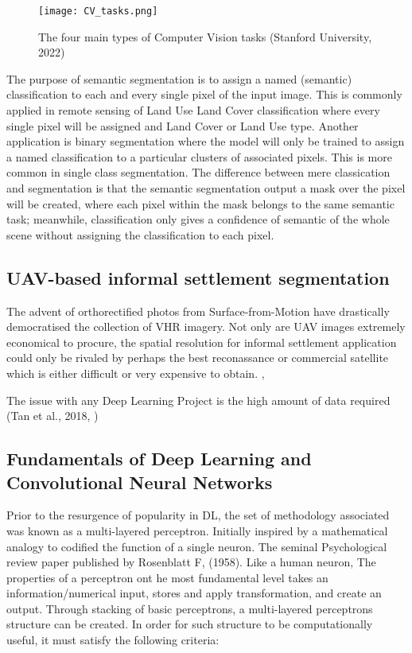 \documentclass[11pt, a4paper, twoside]{report}
\begin{document}
\begin{figure}[H]
\centering
\texttt{[image: CV\_tasks.png]}
  \caption{The four main types of Computer Vision tasks (Stanford University, 2022)}
\label{fig:CV_tasks}
\end{figure}

The purpose of semantic segmentation is to assign a named (semantic) classification to each and every single pixel of the input image. This is commonly applied in remote sensing of Land Use Land Cover classification where every single pixel will be assigned and Land Cover or Land Use type. Another application is binary segmentation where the model will only be trained to assign a named classification to a particular clusters of associated pixels. This is more common in single class segmentation. The difference between mere classication and segmentation is that the semantic segmentation output a mask over the pixel will be created, where each pixel within the mask belongs to the same semantic task; meanwhile, classification only gives a confidence of semantic of the whole scene without assigning the classification to each pixel.


\subsection{UAV-based informal settlement segmentation}\label{CVandCNN}

The advent of orthorectified photos from Surface-from-Motion have drastically democratised the collection of VHR imagery. Not only are UAV images extremely economical to procure, the spatial resolution for informal settlement application could only be rivaled by perhaps the best reconassance or commercial satellite which is either difficult or very expensive to obtain. ,

The issue with any Deep Learning Project is the high amount of data required (Tan et al., 2018, )

\subsection{Fundamentals of Deep Learning and Convolutional Neural Networks}

Prior to the resurgence of popularity in DL, the set of methodology associated was known as a multi-layered perceptron. Initially inspired by a mathematical analogy to codified the function of a single neuron. The seminal Psychological review paper published by Rosenblatt F, (1958). Like a human neuron, The properties of a perceptron ont he most fundamental level takes an information/numerical input, stores and apply transformation, and create an output. Through stacking of basic perceptrons, a multi-layered perceptrons structure can be created. In order for such structure to be computationally useful, it must satisfy the following criteria:
\end{document}
